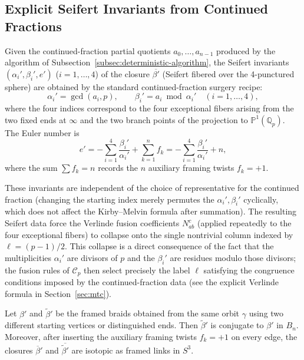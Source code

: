 \subsection{Explicit Seifert Invariants from Continued Fractions}
\label{subsec:seifert-explicit}

Given the continued-fraction partial quotients \(a_0,\dots,a_{n-1}\) produced by the algorithm of Subsection~\ref{subsec:deterministic-algorithm}, the Seifert invariants \((\alpha_i',\beta_i',e')\) (\(i=1,\dots,4\)) of the closure \(\overline{\beta'}\) (Seifert fibered over the 4-punctured sphere) are obtained by the standard continued-fraction surgery recipe:
\[
\alpha_i' = \gcd(a_i,p),\qquad \beta_i' = a_i \bmod \alpha_i' \quad (i=1,\dots,4),
\]
where the four indices correspond to the four exceptional fibers arising from the two fixed ends at \(\infty\) and the two branch points of the projection to \(\mathbb{P}^1(\mathbb{Q}_p)\). The Euler number is
\[
e' = -\sum_{i=1}^4 \frac{\beta_i'}{\alpha_i'} + \sum_{k=1}^n f_k = -\sum_{i=1}^4 \frac{\beta_i'}{\alpha_i'} + n,
\]
where the sum \(\sum f_k = n\) records the \(n\) auxiliary framing twists \(f_k = +1\).

These invariants are independent of the choice of representative for the continued fraction (changing the starting index merely permutes the \(\alpha_i',\beta_i'\) cyclically, which does not affect the Kirby--Melvin formula after summation). The resulting Seifert data force the Verlinde fusion coefficients \(N_{ab}^c\) (applied repeatedly to the four exceptional fibers) to collapse onto the single nontrivial column indexed by \(\ell = (p-1)/2\). This collapse is a direct consequence of the fact that the multiplicities \(\alpha_i'\) are divisors of \(p\) and the \(\beta_i'\) are residues modulo those divisors; the fusion rules of \(\mathcal{C}_p\) then select precisely the label \(\ell\) satisfying the congruence conditions imposed by the continued-fraction data (see the explicit Verlinde formula in Section~\ref{sec:mtc}).

\begin{lemma}
\label{lem:isotopy-strengthened}
Let \(\beta'\) and \(\widetilde{\beta}'\) be the framed braids obtained from the same orbit \(\gamma\) using two different starting vertices or distinguished ends. Then \(\widetilde{\beta}'\) is conjugate to \(\beta'\) in \(B_n\). Moreover, after inserting the auxiliary framing twists \(f_k = +1\) on every edge, the closures \(\overline{\beta}'\) and \(\overline{\widetilde{\beta}'}\) are isotopic as framed links in \(S^3\).
\end{lemma}

